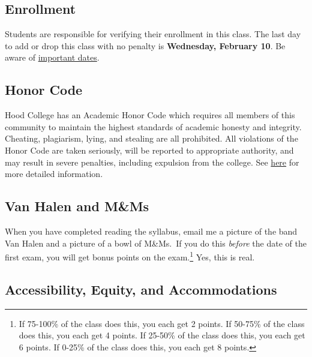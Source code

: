 \documentclass{article}
\begin{document}
\hypertarget{enrollment}{%
\subsection*{Enrollment}\label{enrollment}}

Students are responsible for verifying their enrollment in this class.
The last day to add or drop this class with no penalty is
\textbf{Wednesday, February 10}. Be aware of
\href{https://www.hood.edu/offices-services/registrars-office/academic-calendar}{important
dates}.

\hypertarget{honor-code}{%
\subsection*{Honor Code}\label{honor-code}}

Hood College has an Academic Honor Code which requires all members of
this community to maintain the highest standards of academic honesty and
integrity. Cheating, plagiarism, lying, and stealing are all prohibited.
All violations of the Honor Code are taken seriously, will be reported
to appropriate authority, and may result in severe penalties, including
expulsion from the college. See
\href{http://hood.smartcatalogiq.com/en/2016-2017/Catalog/The-Spirit-of-Hood/The-Academic-Honor-Code-and-Code-of-Conduct}{here}
for more detailed information.

\hypertarget{van-halen-and-mms}{%
\subsection*{Van Halen and M\&Ms}\label{van-halen-and-mms}}

When you have completed reading the syllabus, email me a picture of the
band Van Halen and a picture of a bowl of M\&Ms.~If you do this
\emph{before} the date of the first exam, you will get bonus points on
the exam.\footnote{If 75-100\% of the class does this, you each get 2
  points. If 50-75\% of the class does this, you each get 4 points. If
  25-50\% of the class does this, you each get 6 points. If 0-25\% of
  the class does this, you each get 8 points.} Yes, this is real.

\hypertarget{accessibility-equity-and-accommodations}{%
\subsection*{Accessibility, Equity, and
Accommodations}\label{accessibility-equity-and-accommodations}}
\end{document}
